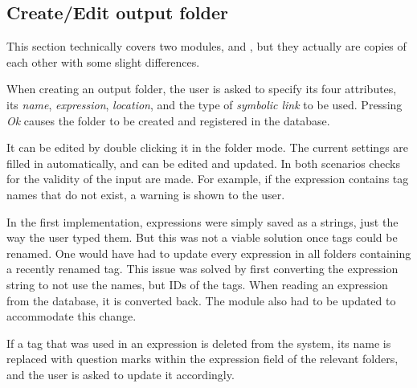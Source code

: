 \subsection{Create/Edit output folder}

This section technically covers two modules,  and , but they actually are copies of each other with some slight differences. 

When creating an output folder, the user is asked to specify its four attributes, its \emph{name}, \emph{expression}, \emph{location}, and the type of \emph{symbolic link} to be used. Pressing \emph{Ok} causes the folder to be created and registered in the database.

It can be edited by double clicking it in the folder mode. The current settings are filled in automatically, and can be edited and updated. In both scenarios checks for the validity of the input are made. For example, if the expression contains tag names that do not exist, a warning is shown to the user. 

In the first implementation, expressions were simply saved as a strings, just the way the user typed them. But this was not a viable solution once tags could be renamed. One would have had to update every expression in all folders containing a recently renamed tag. This issue was solved by first converting the expression string to not use the names, but IDs of the tags. When reading an expression from the database, it is converted back. The  module also had to be updated to accommodate this change. 

If a tag that was used in an expression is deleted from the system, its name is replaced with question marks within the expression field of the relevant folders, and the user is asked to update it accordingly.